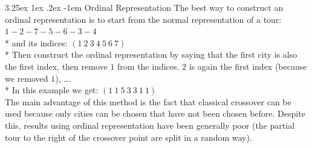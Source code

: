 \documentclass[12pt]{book}
\makeatletter
\renewcommand\paragraph{\@startsection{paragraph}{5}{\z@}%
  {3.25ex \@plus1ex \@minus.2ex}%
  {-1em}%
  {\normalfont\normalsize\bfseries}}
\makeatother
\begin{document}
\paragraph{Ordinal Representation}
The best way to construct an ordinal representation is to start from the normal representation of a tour: $1-2-7-5-6-3-4$\\*
and its indices:
$(1\ 2\ 3\ 4\ 5\ 6\ 7)$\\*
Then construct the ordinal representation by saying that the first city is also the first index, then remove $1$ from the indices. $2$ is again the first index (because we removed $1$), \dots.\\*
In this example we get: $(1\ 1\ 5\ 3\ 3\ 1\ 1)$\\
The main advantage of this method is the fact that classical crossover can be used because only cities can be chosen that have not been chosen before. Despite this, results using ordinal representation have been generally poor (the partial tour to the right of the crossover point are split in a random way).\\
\end{document}
